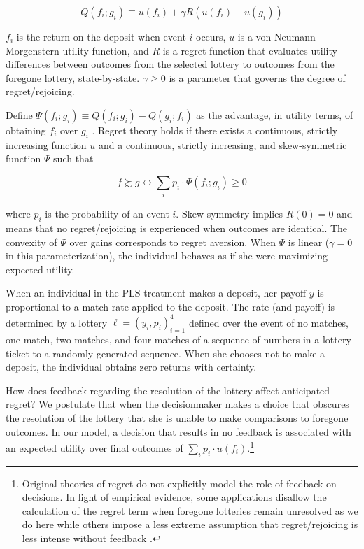 \documentclass[11pt]{article}
\begin{document}
		\[ Q(f_i; g_i) \equiv u(f_i) + \gamma R(u(f_i) - u(g_i)) \]

	$f_i$ is the return on the deposit when event $i$ occurs, $u$ is a von Neumann-Morgenstern utility function, and $R$ is a regret function that evaluates utility differences between outcomes from the selected lottery to outcomes from the foregone lottery, state-by-state. $\gamma \geq 0$ is a parameter that governs the degree of regret/rejoicing.

	Define $\Psi(f_i; g_i) \equiv Q(f_i; g_i) - Q(g_i; f_i)$ as the advantage, in utility terms, of obtaining $f_i$ over $g_i$ . Regret theory holds if there exists a continuous, strictly increasing function $u$ and a continuous, strictly increasing, and skew-symmetric function $\Psi$ such that

		\[ f \succsim g \leftrightarrow \sum_{i} p_{i} \cdot \Psi (f_i; g_i) \geq 0 \]

	\noindent where $p_i$ is the probability of an event $i$. Skew-symmetry implies $R(0) = 0$ and means that no regret/rejoicing is experienced when outcomes are identical. The convexity of $\Psi$ over gains corresponds to regret aversion. When $\Psi$ is linear ($\gamma = 0$ in this parameterization), the individual behaves as if she were maximizing expected utility.

	When an individual in the PLS treatment makes a deposit, her payoff $y$ is proportional to a match rate applied to the deposit. The rate (and payoff) is determined by a lottery $\ell = (y_i, p_i)_{i=1}^{4}$ defined over the event of no matches, one match, two matches, and four matches of a sequence of numbers in a lottery ticket to a randomly generated sequence. When she chooses not to make a deposit, the individual obtains zero returns with certainty.

	How does feedback regarding the resolution of the lottery affect anticipated regret? We postulate that when the decisionmaker makes a choice that obscures the resolution of the lottery that she is unable to make comparisons to foregone outcomes. In our model, a decision that results in no feedback is associated with an expected utility over final outcomes of $\sum_{i} p_{i} \cdot u(f_i)$.\footnote{Original theories of regret \parencite{loomes_regret_1982,bell_risk_1983} do not explicitly model the role of feedback on decisions. In light of empirical evidence, some applications disallow the calculation of the regret term when foregone lotteries remain unresolved as we do here \parencite{strack_too_2019,filiz-ozbay_auctions_2007} while others impose a less extreme assumption that regret/rejoicing is less intense without feedback \parencite{somasundaram_regret_2017,humphrey_feedback-conditional_2004}.}
\end{document}
